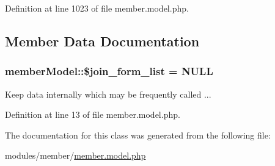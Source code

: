 Definition at line 1023 of file member.\-model.\-php.



\subsection{Member Data Documentation}
\hypertarget{classmemberModel_aa9b942e17ed74955c8700dd74d75d2b2}{
\subsubsection[{\$join\-\_\-form\-\_\-list}]{\setlength{\rightskip}{0pt plus 5cm}member\-Model\-::\$join\-\_\-form\-\_\-list = N\-U\-L\-L}}\label{classmemberModel_aa9b942e17ed74955c8700dd74d75d2b2}


Keep data internally which may be frequently called ... 



Definition at line 13 of file member.\-model.\-php.



The documentation for this class was generated from the following file\-:\begin{DoxyCompactItemize}
\item 
modules/member/\hyperlink{member_8model_8php}{member.\-model.\-php}\end{DoxyCompactItemize}
